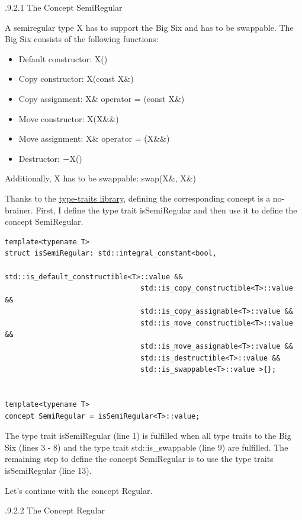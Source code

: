 .9.2.1\hspace{0.2cm} The Concept SemiRegular

A semiregular type X has to support the Big Six and has to be swappable. The Big Six consists of the following functions:

\begin{itemize}
\item 
Default constructor: X()

\item 
Copy constructor: X(const X\&)

\item 
Copy assignment: X\& operator = (const X\&)

\item 
Move constructor: X(X\&\&)

\item 
Move assignment: X\& operator = (X\&\&)

\item 
Destructor: ∼X()
\end{itemize}

Additionally, X has to be swappable: swap(X\&, X\&)

Thanks to the \href{https://en.cppreference.com/w/cpp/header/type_traits}{type-traits library}, defining the corresponding concept is a no-brainer. First, I define the type trait isSemiRegular and then use it to define the concept SemiRegular.

\begin{lstlisting}[style=styleCXX]
template<typename T>
struct isSemiRegular: std::integral_constant<bool,
								std::is_default_constructible<T>::value &&
								std::is_copy_constructible<T>::value &&
								std::is_copy_assignable<T>::value &&
								std::is_move_constructible<T>::value &&
								std::is_move_assignable<T>::value &&
								std::is_destructible<T>::value &&
								std::is_swappable<T>::value >{};


template<typename T>
concept SemiRegular = isSemiRegular<T>::value;
\end{lstlisting}

The type trait isSemiRegular (line 1) is fulfilled when all type traits to the Big Six (lines 3 - 8) and the type trait std::is\_swappable (line 9) are fulfilled. The remaining step to define the concept SemiRegular is to use the type traits isSemiRegular (line 13).

Let’s continue with the concept Regular.

.9.2.2\hspace{0.2cm} The Concept Regular

